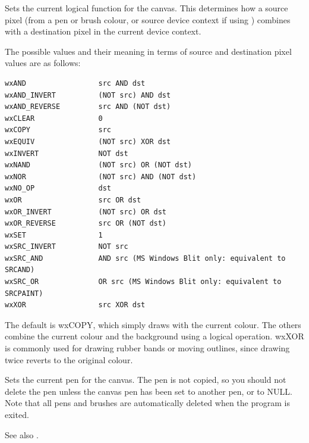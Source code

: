 

Sets the current logical function for the canvas.  This determines how
a source pixel (from a pen or brush colour, or source device context if using )
combines with a destination pixel in the current device context.

The possible values
and their meaning in terms of source and destination pixel values are
as follows:

\begin{verbatim}
wxAND                 src AND dst
wxAND_INVERT          (NOT src) AND dst
wxAND_REVERSE         src AND (NOT dst)
wxCLEAR               0
wxCOPY                src
wxEQUIV               (NOT src) XOR dst
wxINVERT              NOT dst
wxNAND                (NOT src) OR (NOT dst)
wxNOR                 (NOT src) AND (NOT dst)
wxNO_OP               dst
wxOR                  src OR dst
wxOR_INVERT           (NOT src) OR dst
wxOR_REVERSE          src OR (NOT dst)
wxSET                 1
wxSRC_INVERT          NOT src
wxSRC_AND             AND src (MS Windows Blit only: equivalent to SRCAND)
wxSRC_OR              OR src (MS Windows Blit only: equivalent to SRCPAINT)
wxXOR                 src XOR dst
\end{verbatim}

The default is wxCOPY, which simply draws with the current colour.
The others combine the current colour and the background using a
logical operation.  wxXOR is commonly used for drawing rubber bands or
moving outlines, since drawing twice reverts to the original colour.

\label{wxcanvassetpen}


Sets the current pen for the canvas.  The pen is not copied, so you
should not delete the pen unless the canvas pen has been set to
another pen, or to NULL. Note that all pens and brushes are
automatically deleted when the program is exited.

See also .

\label{wxcanvassetscrollbars}


